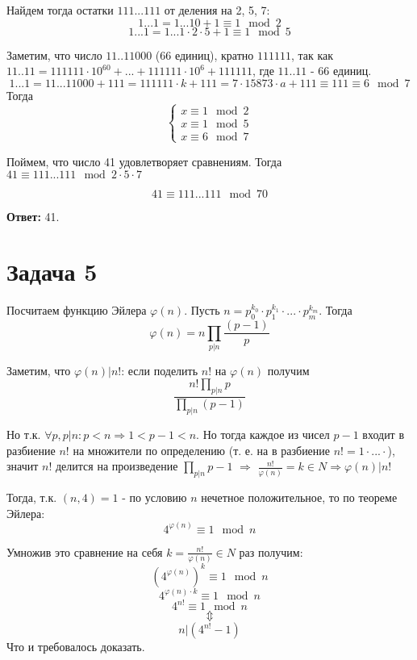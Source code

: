 \documentclass{article}
\begin{document}
		Найдем тогда остатки $111...111$ от деления на 2, 5, 7:
			$$1...1 = 1...10 + 1 \equiv 1 \mod 2$$
			$$1...1 = 1...1 \cdot 2 \cdot 5 + 1 \equiv 1\mod 5$$
		
		Заметим, что число $11..11000$ (66 единиц), кратно $111111$, так как $11..11 = 111111 \cdot 10^{60} + ... + 111111 \cdot 10 ^ 6 + 111111$, где $11..11$ - 66 единиц.   
			$$1...1 = 11...11000 + 111 = 111111 \cdot k + 111  = 7 \cdot 15873  \cdot a + 111 \equiv 111 \equiv 6\mod 7$$
	    Тогда 
	    \begin{equation*} 
		    \begin{cases}
			    x \equiv 1 \mod 2 \\
			    x \equiv 1 \mod 5 \\
			    x \equiv 6 \mod 7
		    \end{cases}
	    \end{equation*}
		
		Поймем, что число 41 удовлетворяет сравнениям. Тогда $41 \equiv 111...111 \mod 2 \cdot 5 \cdot 7 $
		
		$$ 41 \equiv 111...111 \mod 70 $$
		
		\textbf{Ответ:} 41.
		
		\section{Задача 5}
		  
		  Посчитаем функцию Эйлера $\varphi(n)$. Пусть $n = p_0^{k_0} \cdot p_1^{k_1} \cdot ... \cdot p_m^{k_m}$. Тогда $$\varphi(n) = n \prod_{p|n}\frac{(p - 1)}{p}$$
		  
		  Заметим, что $\varphi(n) | n!$: если поделить $n!$ на $\varphi(n)$ получим  
		  $$\frac {n! \prod_{p|n}p} {\prod_{p|n} (p - 1)}$$
		  
		  Но т.к. $\forall p, p|n: p < n \Rightarrow 1 < p - 1 < n$. Но тогда каждое из чисел $p - 1$ входит в разбиение $n!$ на множители по определению (т. е. на в разбиение $n! = 1 \cdot ... \cdot$), значит $n!$ делится на произведение $\prod_{p|n}{p - 1}$  $\Rightarrow$ $\frac {n!}{\varphi(n)} = k \in N \Rightarrow \varphi(n) | n!$
		  
		  Тогда, т.к. $(n, 4) = 1$ - по условию $n$ нечетное положительное, то по теореме Эйлера:
		  $$ 4^{\varphi(n)} \equiv 1 \mod n $$
		  
		  Умножив это сравнение на себя $k = \frac {n!}{\varphi(n)} \in N$ раз получим:
		  $$ (4^{\varphi(n)})^{k} \equiv 1 \mod n $$
		  $$ 4^{\varphi(n) \cdot k} \equiv 1 \mod n $$
		  $$ 4^{n!} \equiv 1 \mod n $$
		  $$\Updownarrow$$
		  $$n | (4^{n!} - 1)$$		  
		  Что и требовалось доказать.
		  
\end{document}
